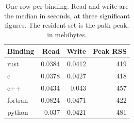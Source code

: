 \begin{table}[tbp]
\centering
\footnotesize
\caption{One row per binding. Read and write are the median in seconds, at three significant figures. The resident set is the path peak, in mebibytes.}
\label{tab:conread}
\begin{tabular}{@{}lrrr@{}}
\toprule
Binding & Read & Write & Peak RSS \\
\midrule
rust & 0.0384 & 0.0412 & 419 \\
c & 0.0378 & 0.0427 & 418 \\
c++ & 0.0434 & 0.043 & 457 \\
fortran & 0.0824 & 0.0471 & 422 \\
python & 0.037 & 0.0421 & 481 \\
\bottomrule
\end{tabular}
\end{table}
